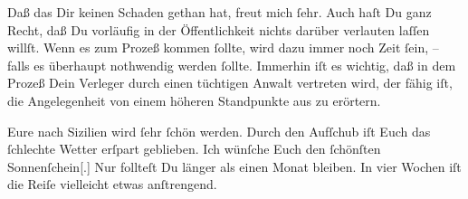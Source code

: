 \pstart
           Daß das \label{K_L03442-3v}\label{K_L03442-3} Dir keinen Schaden gethan hat, freut mich{ }ſehr. Auch haſt Du ganz Recht, daß
               Du vorläufig in der Öffentlichkeit nichts darüber verlauten laſſen willſt. Wenn es
               zum Prozeß kommen{ }ſollte, wird dazu immer noch Zeit{ }ſein, – falls es überhaupt
               nothwendig werden{ }ſollte. Immerhin iſt es wichtig, daß in dem Prozeß Dein Verleger durch einen tüchtigen Anwalt vertreten wird, der  fähig {\pb}iſt, die Angelegenheit von einem höheren Standpunkte
               aus zu erörtern.\pend
           
\pstart
           Eure\label{K_L03442-4v}\label{K_L03442-4} nach Sizilien wird{ }ſehr{ }ſchön werden.
               Durch den Aufſchub iſt Euch das{ }ſchlechte Wetter erſpart geblieben. Ich wünſche Euch
               den{ }ſchönſten Sonnenſchein{[}.{]} Nur follteſt Du länger als einen
               Monat bleiben. In vier Wochen iſt die Reiſe vielleicht etwas anſtrengend.\pend
           
